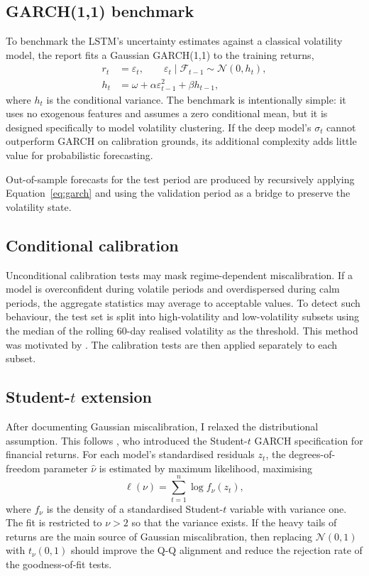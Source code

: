 \documentclass[%
 amsmath,amssymb,
 aps,
 pra,
 floatfix,
 raggedbottom,
 nofootinbib,
12pt,]{revtex4-2}
\providecommand{\texorpdfstring}[2]{#1}
\begin{document}
\subsection{GARCH(1,1) benchmark}

To benchmark the LSTM's uncertainty estimates against a classical volatility model, the report fits a Gaussian GARCH(1,1) to the training returns,
\begin{align}
    r_t &= \varepsilon_t, \qquad \varepsilon_t \mid \mathcal{F}_{t-1} \sim \mathcal{N}(0,h_t), \\
    h_t &= \omega + \alpha\varepsilon_{t-1}^2 + \beta h_{t-1},
    \label{eq:garch}
\end{align}
where $h_t$ is the conditional variance.
The benchmark is intentionally simple: it uses no exogenous features and assumes a zero conditional mean, but it is designed specifically to model volatility clustering.
If the deep model's $\sigma_t$ cannot outperform GARCH on calibration grounds, its additional complexity adds little value for probabilistic forecasting.

Out-of-sample forecasts for the test period are produced by recursively applying Equation~\eqref{eq:garch} and using the validation period as a bridge to preserve the volatility state.

\subsection{Conditional calibration}

Unconditional calibration tests may mask regime-dependent miscalibration.
If a model is overconfident during volatile periods and overdispersed during calm periods, the aggregate statistics may average to acceptable values.
To detect such behaviour, the test set is split into high-volatility and low-volatility subsets using the median of the rolling 60-day realised volatility as the threshold. This method was motivated by \citet{kuleshov2018accurate}.
The calibration tests are then applied separately to each subset.

\subsection{\texorpdfstring{Student-$t$ extension}{Student-t extension}}

After documenting Gaussian miscalibration, I relaxed the distributional assumption. This follows \citet{bollerslev1987}, who introduced the Student-$t$ GARCH specification for financial returns.
For each model's standardised residuals $z_t$, the degrees-of-freedom parameter $\hat{\nu}$ is estimated by maximum likelihood, maximising
\begin{equation}
    \ell(\nu) = \sum_{t=1}^{n}\log f_{\nu}(z_t),
    \label{eq:tlik}
\end{equation}
where $f_{\nu}$ is the density of a standardised Student-$t$ variable with variance one.
The fit is restricted to $\nu > 2$ so that the variance exists.
If the heavy tails of returns are the main source of Gaussian miscalibration, then replacing $\mathcal{N}(0,1)$ with $t_{\nu}(0,1)$ should improve the Q-Q alignment and reduce the rejection rate of the goodness-of-fit tests.
\end{document}
